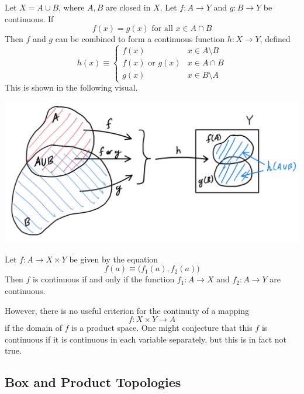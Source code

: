 \documentclass{article}
\begin{document}
    \begin{lemma}
    Let $X = A \cup B$, where $A, B$ are closed in $X$. Let $f: A \longrightarrow Y$ and $g: B \longrightarrow Y$ be continuous. If 
    \[f(x) = g(x) \text{ for all } x \in A \cap B\]
    Then $f$ and $g$ can be combined to form a continuous function $h: X \longrightarrow Y$, defined
    \[h(x) \equiv \begin{cases}
          f(x) & x \in A \setminus B \\
          f(x) \text{ or } g(x) & x \in A \cap B \\
          g(x) & x \in B \setminus A
    \end{cases}\]
    This is shown in the following visual. 
    \begin{center}
        \includegraphics[scale=0.25]{img/Gluing_Lemma.PNG}
    \end{center}
    \end{lemma}

    \begin{theorem}
    Let $f: A \longrightarrow X \times Y$ be given by the equation 
    \[f(a) \equiv \big( f_1 (a), f_2(a) \big)\]
    Then $f$ is continuous if and only if the function $f_1: A \longrightarrow X$ and $f_2: A \longrightarrow Y$ are continuous. 
    \end{theorem}

    However, there is no useful criterion for the continuity of a mapping 
    \[f: X \times Y \longrightarrow A\]
    if the domain of $f$ is a product space. One might conjecture that this $f$ is continuous if it is continuous in each variable separately, but this is in fact not true. 

  \subsection{Box and Product Topologies}
\end{document}
